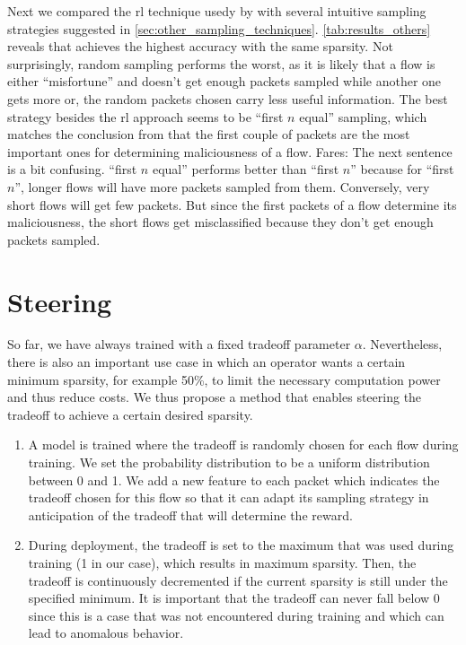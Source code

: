 \documentclass[conference]{IEEEtran}
\newcommand\note[2]{{\color{#1}#2}}
\begin{document}
Next we compared the \gls{rl} technique usedy by \ours{} with several intuitive sampling strategies suggested in \autoref{sec:other_sampling_techniques}. 
\autoref{tab:results_others} reveals that \ours{} achieves the highest accuracy with the same sparsity. Not surprisingly, random sampling performs the worst, as it is likely that a flow is either ``misfortune'' and doesn't get enough packets sampled while another  one gets more or, the random packets chosen carry less useful information. The best strategy besides the \gls{rl} approach seems to be ``first $n$ equal'' sampling, which matches the conclusion from \cite{hartl_explainability_2019} that the first couple of packets are the most important ones for determining maliciousness of a flow. 
\note{blue}{Fares: The next sentence is a bit confusing.}
``first $n$ equal'' performs better than ``first $n$'' because for ``first $n$'', longer flows will have more packets sampled from them. Conversely, very short flows will get few packets. But since the first packets of a flow determine its maliciousness, the short flows get misclassified because they don't get enough packets sampled. 


\section{Steering}

So far, we have always trained \ours{} with a fixed tradeoff parameter $\alpha$. Nevertheless, there is also an important use case in which an operator wants a certain minimum sparsity, for example 50\%, to limit the necessary computation power and thus reduce costs. 
We thus propose a method that enables steering the tradeoff to achieve a certain desired sparsity.
\begin{enumerate}
\item A model is trained where the tradeoff is randomly chosen for each flow during training. We set the probability distribution to be a uniform distribution between 0 and 1. We add a new feature to each packet which indicates the tradeoff chosen for this flow so that it can adapt its sampling strategy in anticipation of the tradeoff that will determine the reward.
\item During deployment, the tradeoff is set to the maximum that was used during training (1 in our case), which results in maximum sparsity. Then, the tradeoff is continuously decremented if the current sparsity is still under the specified minimum. It is important that the tradeoff can never fall below 0 since this is a case that was not encountered during training and which can lead to anomalous behavior. 
\end{enumerate}
\end{document}
